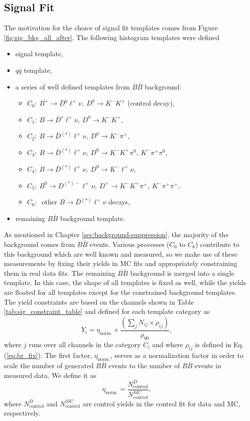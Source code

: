 \subsection{Signal Fit}\label{sec:templates-in-signal-fits}
The motivation for the choice of signal fit templates comes from Figure \ref{fig:sig_bkg_all_after}. The following histogram templates were defined
\begin{itemize}
	\item signal template,
	\item $q \bar q$ template,
	\item a series of well defined templates from $B \bar B$ background:
	\begin{itemize}
		\item $C_0:~B^+ \to \bar{D} {}^0 \ell^+ \nu,~D^0 \to K^-K^+$ (control decay),
		\item $C_1:~B \to \bar{D} {}^* \ell^+ \nu,~D^0 \to K^-K^+$,
		\item $C_2:~B \to \bar{D} {}^{(*)} \ell^+ \nu,~D^0 \to K^-\pi^+$,
		\item $C_3:~B \to \bar{D} {}^{(*)} \ell^+ \nu,~D^0 \to K^-K^+\pi^0,~K^-\pi^+\pi^0$,
		\item $C_4:~B \to \bar{D} {}^{(*)} \ell^+ \nu,~D^0 \to K^-\ell^+\nu$,
		\item $C_5:~B^0 \to D^{(*)-} \ell^+ \nu,~D^+ \to K^-K^+\pi^+,~K^-\pi^+\pi^+$,
		\item $C_6:~$ other $B \to \bar D {}^{(*)} \ell^+ \nu$ decays,
	\end{itemize}
	\item remaining $B \bar B$ background template.
\end{itemize}
As mentioned in Chapter \ref{sec:background-suppression}, the majority of the background comes from $B \bar B$ events. Various processes ($C_0$ to $C_6$) contribute to this background which are well known and measured, so we make use of these measurements by fixing their yields in MC fits and appropriately constraining them in real data fits. The remaining $B \bar B$ background is merged into a single template. In this case, the shape of all templates is fixed as well, while the yields are floated for all templates except for the constrained background templates. The yield constraints are based on the channels shown in Table \ref{tab:sig_constraint_table} and defined for each template category as 
\begin{equation}
Y_i = \eta_{\mathrm{norm.}} \times \frac{\left(\sum_j N_{ij}\times \rho_{ij} \right)}{\rho_{00}},
\label{eq:sig_fix}
\end{equation}
where $j$ runs over all channels in the category $C_i$ and where $\rho_{ij}$ is defined in Eq. (\ref{eq:br_fix}). The first factor, $\eta_{\mathrm{norm.}}$, serves as a normalization factor in order to scale the number of generated $B \bar B$ events to the number of $B \bar B$ events in measured data. We define it as
\begin{equation}
\eta_{\mathrm{norm.}} = \frac{N_{\mathrm{control}}^D}{N_{\mathrm{control}}^{MC}},
\end{equation}
where $N_{\mathrm{control}}^D$ and $N_{\mathrm{control}}^{MC}$ are control yields in the control fit for data and MC, respectively.

